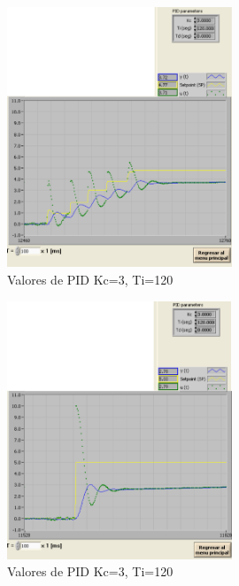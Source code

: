 \documentclass[]{article}
\begin{document}
\begin{figure}[h!]
	\centering
	\includegraphics[width=0.6\textwidth]{Imagenes/signalActividad2B}
	\caption{Valores de PID Kc=3, Ti=120}
	\label{fig:signalActividad2B}
\end{figure}


\begin{figure}[h!]
	\centering
	\includegraphics[width=0.6\textwidth]{Imagenes/signalActividad3}
	\caption{Valores de PID Kc=3, Ti=120}
	\label{fig:signalActividad3}
\end{figure}
\end{document}
